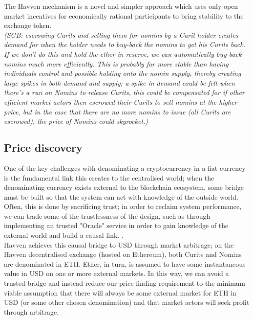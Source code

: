 \documentclass{article}
\begin{document}
\noindent The Havven mechanism is a novel and simpler approach which uses only open market incentives for economically rational participants to bring stability to the exchange token. \\

\textit{(SGB: escrowing Curits and selling them for nomins by a Curit holder creates demand for when the holder needs to buy-back the nomins to get his Curits back. If we don't do this and hold the ether in reserve, we can automatically buy-back nomins much more efficiently. This is probably far more stable than having individuals control and possible holding onto the nomin supply, thereby creating large spikes in both demand and supply; a spike in demand could be felt when there's a run on Nomins to release Curits, this could be compensated for if other efficient market actors then escrowed their Curits to sell nomins at the higher price, but in the case that there are no more nomins to issue (all Curits are escrowed), the price of Nomins could skyrocket.)}

\subsection{Price discovery}

One of the key challenges with denominating a cryptocurrency in a fiat currency is the fundamental link this creates to the centralised world; when the denominating currency exists external to the blockchain ecosystem, some bridge must be built so that the system can act with knowledge of the outside world. Often, this is done by sacrificing trust; in order to reclaim system performance, we can trade some of the trustlessness of the design, such as through implementing an trusted "Oracle" service in order to gain knowledge of the external world and build a causal link. \cite{brooks2017blog}.\\

\noindent Havven achieves this causal bridge to USD through market arbitrage; on the Havven decentralised exchange (hosted on Ethereum), both Curits and Nomins are denominated in ETH. Ether, in turn, is assumed to have some instantaneous value in USD on one or more external markets. In this way, we can avoid a trusted bridge and instead reduce our price-finding requirement to the minimum viable assumption that there will always be some external market for ETH in USD (or some other chosen denomination) and that market actors will seek profit through arbitrage. \\
\end{document}
